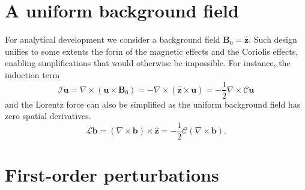 \section{A uniform background field}

For analytical development we consider a background field $\mathbf{B}_0 = \hat{\mathbf{z}}$. Such design unifies to some extents the form of the magnetic effects and the Coriolis effects, enabling simplifications that would otherwise be impossible. For instance, the induction term
%
\begin{equation}
    \mathcal{I} \mathbf{u} = \nabla\times (\mathbf{u}\times \mathbf{B}_0) = -\nabla\times (\hat{\mathbf{z}}\times \mathbf{u}) = - \frac{1}{2} \nabla\times \mathcal{C} \mathbf{u}
\end{equation}
%
and the Lorentz force can also be simplified as the uniform background field has zero spatial derivatives.
%
\begin{equation}
    \mathcal{L} \mathbf{b} = (\nabla\times \mathbf{b})\times \hat{\mathbf{z}} = - \frac{1}{2} \mathcal{C} (\nabla\times \mathbf{b}).
\end{equation}
%


\section{First-order perturbations}

